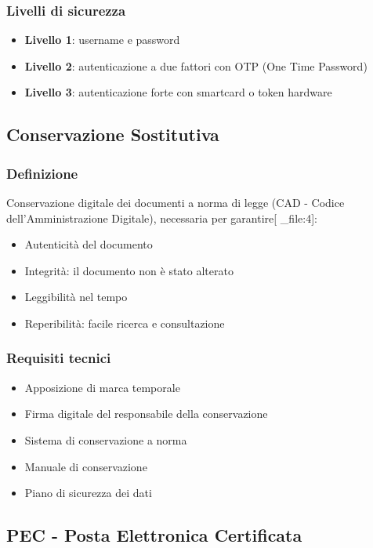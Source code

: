 \documentclass[12pt,a4paper]{article}
\begin{document}
\subsubsection{Livelli di sicurezza}
\begin{itemize}
    \item \textbf{Livello 1}: username e password
    \item \textbf{Livello 2}: autenticazione a due fattori con OTP (One Time Password)
    \item \textbf{Livello 3}: autenticazione forte con smartcard o token hardware
\end{itemize}

\subsection{Conservazione Sostitutiva}

\subsubsection{Definizione}
Conservazione digitale dei documenti a norma di legge (CAD - Codice dell'Amministrazione Digitale), necessaria per garantire[ _file:4]:
\begin{itemize}
    \item Autenticità del documento
    \item Integrità: il documento non è stato alterato
    \item Leggibilità nel tempo
    \item Reperibilità: facile ricerca e consultazione
\end{itemize}

\subsubsection{Requisiti tecnici}
\begin{itemize}
    \item Apposizione di marca temporale
    \item Firma digitale del responsabile della conservazione
    \item Sistema di conservazione a norma
    \item Manuale di conservazione
    \item Piano di sicurezza dei dati
\end{itemize}

\subsection{PEC - Posta Elettronica Certificata}
\end{document}
